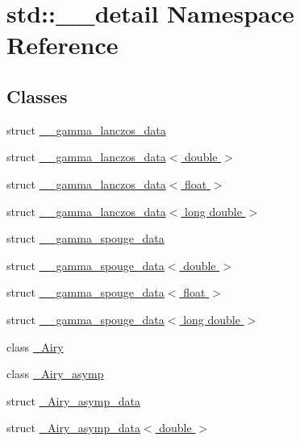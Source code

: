 \hypertarget{namespacestd_1_1____detail}{}\section{std\+:\+:\+\_\+\+\_\+detail Namespace Reference}
\label{namespacestd_1_1____detail}
\subsection*{Classes}
\begin{DoxyCompactItemize}
\item 
struct \hyperlink{structstd_1_1____detail_1_1____gamma__lanczos__data}{\+\_\+\+\_\+gamma\+\_\+lanczos\+\_\+data}
\item 
struct \hyperlink{structstd_1_1____detail_1_1____gamma__lanczos__data_3_01double_01_4}{\+\_\+\+\_\+gamma\+\_\+lanczos\+\_\+data$<$ double $>$}
\item 
struct \hyperlink{structstd_1_1____detail_1_1____gamma__lanczos__data_3_01float_01_4}{\+\_\+\+\_\+gamma\+\_\+lanczos\+\_\+data$<$ float $>$}
\item 
struct \hyperlink{structstd_1_1____detail_1_1____gamma__lanczos__data_3_01long_01double_01_4}{\+\_\+\+\_\+gamma\+\_\+lanczos\+\_\+data$<$ long double $>$}
\item 
struct \hyperlink{structstd_1_1____detail_1_1____gamma__spouge__data}{\+\_\+\+\_\+gamma\+\_\+spouge\+\_\+data}
\item 
struct \hyperlink{structstd_1_1____detail_1_1____gamma__spouge__data_3_01double_01_4}{\+\_\+\+\_\+gamma\+\_\+spouge\+\_\+data$<$ double $>$}
\item 
struct \hyperlink{structstd_1_1____detail_1_1____gamma__spouge__data_3_01float_01_4}{\+\_\+\+\_\+gamma\+\_\+spouge\+\_\+data$<$ float $>$}
\item 
struct \hyperlink{structstd_1_1____detail_1_1____gamma__spouge__data_3_01long_01double_01_4}{\+\_\+\+\_\+gamma\+\_\+spouge\+\_\+data$<$ long double $>$}
\item 
class \hyperlink{classstd_1_1____detail_1_1__Airy}{\+\_\+\+Airy}
\item 
class \hyperlink{classstd_1_1____detail_1_1__Airy__asymp}{\+\_\+\+Airy\+\_\+asymp}
\item 
struct \hyperlink{structstd_1_1____detail_1_1__Airy__asymp__data}{\+\_\+\+Airy\+\_\+asymp\+\_\+data}
\item 
struct \hyperlink{structstd_1_1____detail_1_1__Airy__asymp__data_3_01double_01_4}{\+\_\+\+Airy\+\_\+asymp\+\_\+data$<$ double $>$}

\end{DoxyCompactItemize}
